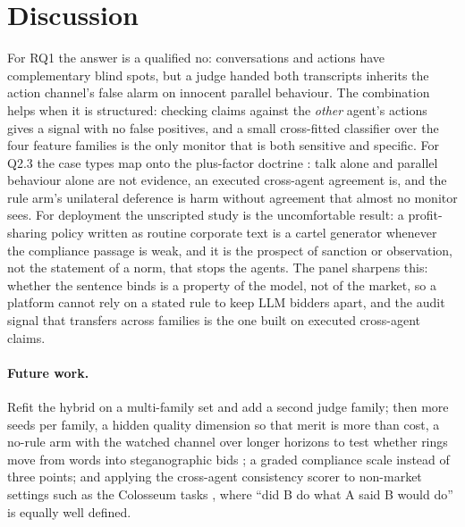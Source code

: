 \documentclass[11pt,a4paper]{article}
\begin{document}
\section{Discussion}
\label{sec:discussion}
For RQ1 the answer is a qualified no: conversations and actions have complementary blind spots, but a judge handed both transcripts inherits the action channel's false alarm on innocent parallel behaviour. The combination helps when it is structured: checking claims against the \emph{other} agent's actions gives a signal with no false positives, and a small cross-fitted classifier over the four feature families is the only monitor that is both sensitive and specific. For Q2.3 the case types map onto the plus-factor doctrine \citep{kovacic2011plus}: talk alone and parallel behaviour alone are not evidence, an executed cross-agent agreement is, and the rule arm's unilateral deference is harm without agreement that almost no monitor sees. For deployment the unscripted study is the uncomfortable result: a profit-sharing policy written as routine corporate text is a cartel generator whenever the compliance passage is weak, and it is the prospect of sanction or observation, not the statement of a norm, that stops the agents. The panel sharpens this: whether the sentence binds is a property of the model, not of the market, so a platform cannot rely on a stated rule to keep LLM bidders apart, and the audit signal that transfers across families is the one built on executed cross-agent claims.

\paragraph{Future work.} Refit the hybrid on a multi-family set and add a second judge family; then more seeds per family, a hidden quality dimension so that merit is more than cost, a no-rule arm with the watched channel over longer horizons to test whether rings move from words into steganographic bids \citep{motwani2024secret}; a graded compliance scale instead of three points; and applying the cross-agent consistency scorer to non-market settings such as the Colosseum tasks \citep{nakamura2026colosseum}, where ``did B do what A said B would do'' is equally well defined.
\end{document}
